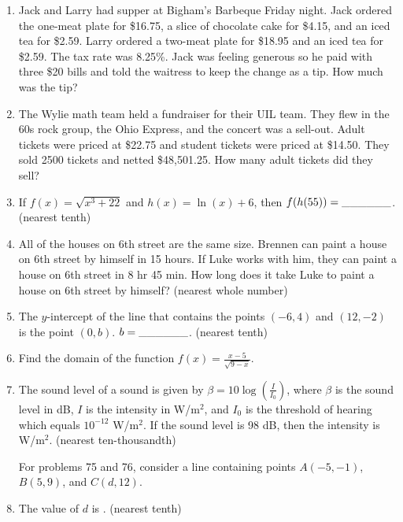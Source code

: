 \documentclass[../uilmath.tex]{subfiles}
\begin{document}
\begin{enumerate}[label=\bfseries\arabic*.]
        \item %
        Jack and Larry had supper at Bigham's Barbeque Friday night. Jack ordered the one-meat plate for \$16.75, a slice of chocolate cake for \$4.15, and an 
        iced tea for \$2.59. Larry ordered a two-meat plate for \$18.95 and an iced tea for \$2.59. The tax rate was 8.25\%. Jack was feeling generous so he paid with 
        three \$20 bills and told the waitress to keep the change as a tip. How much was the tip?

        \item %
        The Wylie math team held a fundraiser for their UIL team. They flew in the 60s rock group, the Ohio Express, and the concert was a sell-out.
        Adult tickets were priced at \$22.75 and student tickets were priced at \$14.50. They sold 2500 tickets and netted \$48,501.25. How many adult tickets did they sell?

        \item %
        If $f(x)=\sqrt{x^3+22}$ and $h(x)=\ln(x)+6$, then $f(h(55))=\_\_\_\_\_\_$. (nearest tenth)

        \item %
        All of the houses on 6th street are the same size. Brennen can paint a house on 6th street by himself in 15 hours. If 
        Luke works with him, they can paint a house on 6th street in 8 hr 45 min. How long does it take Luke to paint a house on 6th street by himself? (nearest whole number)

        \item %
        The $y$-intercept of the line that contains the points $(-6,4)$ and $(12,-2)$ is the point $(0,b)$. $b=\_\_\_\_\_\_$. (nearest tenth)

        \item %
        Find the domain of the function $f(x)=\frac{x-5}{\sqrt{9-x}}$.

        \item %
        The sound level of a sound is given by $\beta = 10\log\left(\frac{I}{I_0}\right)$, where $\beta$ is the sound level in dB,
        $I$ is the intensity in W/m$^2$, and $I_0$ is the threshold of hearing which equals $10^{-12}$ W/m$^2$. If the sound level is 
        98 dB, then the intensity is \blank W/m$^2$. (nearest ten-thousandth)

        
        For problems 75 and 76, consider a line containing points $A(-5,-1)$, $B(5,9)$, and $C(d,12)$.
        \item %
        The value of $d$ is \blank. (nearest tenth)


\end{enumerate}
\end{document}
